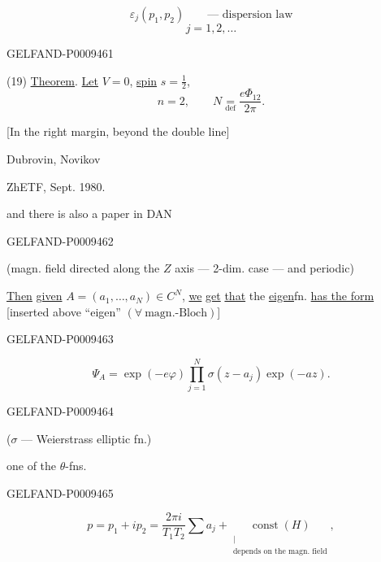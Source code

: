 \begin{equation*}
 \varepsilon_j(p_1,p_2)\qquad\text{--- dispersion law}
 \tag{18}
\end{equation*}
\[
 j=1,2,\ldots
\]

\begin{GelfandAdjacentEvidence}{GELFAND-P000946}{1}

(19) \underline{Theorem}. \underline{Let} $V=0$, \underline{spin} $s=\frac12$,
\[
 n=2,\qquad N\underset{\mathrm{def}}{=}\frac{e\Phi_{12}}{2\pi}.
\]

[In the right margin, beyond the double line]\par
Dubrovin, Novikov\par
ZhETF, Sept. 1980.\par
and there is also a paper in DAN
\end{GelfandAdjacentEvidence}
\begin{GelfandAdjacentEvidence}{GELFAND-P000946}{2}


(magn. field directed along the $Z$ axis --- 2-dim. case --- and periodic)

\underline{Then} \underline{given} $A=(a_1,\ldots,a_N)\in C^N$, \underline{we} \underline{get} \underline{that} the \underline{eigen}fn. \underline{has the form}
[inserted above “eigen” $(\forall\ \text{magn.-Bloch})$]
\end{GelfandAdjacentEvidence}
\begin{GelfandAdjacentEvidence}{GELFAND-P000946}{3}


\begin{equation*}
 \Psi_A=\exp(-e\varphi)\prod_{j=1}^N\sigma(z-a_j)\exp(-az).
 \tag{20}
\end{equation*}
\end{GelfandAdjacentEvidence}
\begin{GelfandAdjacentEvidence}{GELFAND-P000946}{4}

($\sigma$ --- Weierstrass elliptic fn.)\par
one of the $\theta$-fns.
\end{GelfandAdjacentEvidence}
\begin{GelfandAdjacentEvidence}{GELFAND-P000946}{5}


\begin{equation*}
 p=p_1+ip_2=\frac{2\pi i}{T_1T_2}\sum a_j+
 \underset{\substack{\vert\\\text{depends on the magn. field}}}{\operatorname{const}(H)},
 \tag{21}
\end{equation*}
\end{GelfandAdjacentEvidence}
